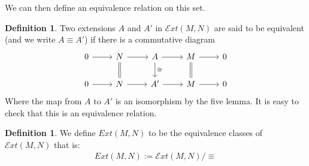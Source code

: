 \documentclass[12pt]{book}
\theoremstyle{definition}
\newtheorem{definition}[theorem]{Definition}
\begin{document}
We can then define an equivalence relation on this set. 

\begin{definition}
    Two extensions $A$ and $A'$ in $\mathcal{E}xt(M,N)$ are said to be equivalent (and we write $A \equiv A'$) if there is a commutative diagram
        \[
        \begin{tikzcd}
        0 \arrow[r] & N \arrow[r] \arrow[d, equal] 
        & A \arrow[r] \arrow[d, "\cong"] 
        & M \arrow[r] \arrow[d, equal] 
        & 0 \\
        0 \arrow[r] & N \arrow[r] 
        & A' \arrow[r] 
        & M \arrow[r] 
        & 0
        \end{tikzcd}
        \]
    Where the map from $A$ to $A'$ is an isomorphism by the five lemma. It is easy to check that this is an equivalence relation.   
\end{definition}

\begin{definition}
    We define $Ext(M,N)$ to be the equivalence classes of $\mathcal{E}xt(M,N)$ that is: 
    \begin{align*}
        Ext(M,N) := \mathcal{E}xt(M,N) / \equiv 
    \end{align*}
\end{definition}
\end{document}
